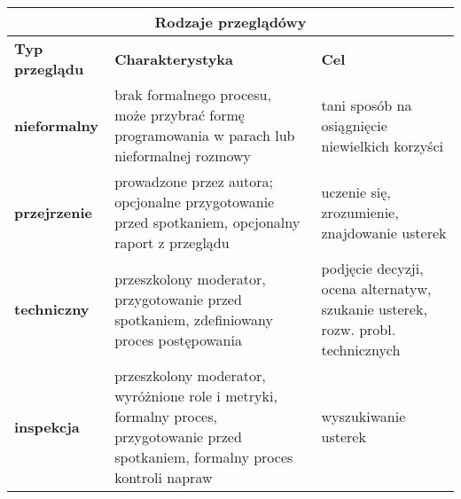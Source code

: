 \documentclass[../main.tex]{subfiles}
\begin{document}
    \begin{table}[H]
        \begin{center}
            \begin{tabular}{|p{3cm}||p{8cm}|p{5cm}|}
                \hline
                \multicolumn{3}{|c|}{ \textbf{Rodzaje przeglądówy}}\\
                \hline
                \textbf{Typ przeglądu} & \textbf{Charakterystyka} & \textbf{Cel}\\
                \hline
                \hline
                \textbf{nieformalny} & brak formalnego procesu, może przybrać formę programowania w parach lub nieformalnej rozmowy &
                tani sposób na osiągnięcie niewielkich korzyści\\
                \hline
                \textbf{przejrzenie} & prowadzone przez autora; opcjonalne przygotowanie przed spotkaniem,
                opcjonalny raport z przeglądu & uczenie się, zrozumienie, znajdowanie usterek\\
                \hline
                \textbf{techniczny} & przeszkolony moderator, przygotowanie przed spotkaniem, zdefiniowany proces
                postępowania & podjęcie decyzji, ocena alternatyw, szukanie usterek, rozw. probl. technicznych\\
                \hline
                \textbf{inspekcja} & przeszkolony moderator, wyróżnione role i metryki, formalny proces, przygotowanie przed
                spotkaniem, formalny proces kontroli napraw & wyszukiwanie usterek\\
                \hline
            \end{tabular}
        \end{center}
    \end{table}
\end{document}
